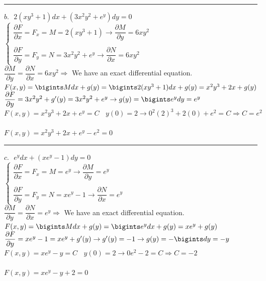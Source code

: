 \documentclass[fleqn]{article}
\begin{document}
\begin{enumerate}
      \textcolor{hwColor}{  
        \rule{15cm}{0.4pt}  
      }

      \textcolor{hwColor}{ 
        $b. ~~~ 2(xy^3+1)dx+(3x^2y^2+e^y)dy=0$ \\
        $
        \begin{cases}
          \dfrac{\partial F}{\partial x}=F_x=M=2(xy^3+1) \rightarrow \dfrac{\partial M}{\partial y}=6xy^2 \\
          \\
          \dfrac{\partial F}{\partial y}=F_y=N=3x^2y^2+e^y \rightarrow \dfrac{\partial N}{\partial x}=6xy^2
        \end{cases}
        $ \\
        $\dfrac{\partial M}{\partial y}=\dfrac{\partial N}{\partial x}=6xy^2 \Longrightarrow$ We have an exact differential equation. \\
        $F(x,y)=\bigints Mdx+g(y)=\bigints 2(xy^3+1) dx+g(y)=x^2y^3+2x+g(y)$ \\
        $\dfrac{\partial F}{\partial y}=3x^2y^2+g^{\prime}(y)=3x^2y^2+e^y \rightarrow g(y)=\bigints e^ydy=e^y$ \\
        $F(x,y)=x^2y^3+2x+e^y=C ~~~~ y(0)=2 \rightarrow 0^2(2)^3+2(0)+e^2=C \Longrightarrow C=e^2$ \\
        \\
        $F(x,y)=x^2y^3+2x+e^y-e^2=0$
      }

      \textcolor{hwColor}{  
        \rule{15cm}{0.4pt}  
      }

      \textcolor{hwColor}{ 
        $c. ~~~ e^ydx+(xe^y-1)dy=0 $ \\
        $
        \begin{cases}
          \dfrac{\partial F}{\partial x}=F_x=M=e^y \rightarrow \dfrac{\partial M}{\partial y}=e^y \\
          \\
          \dfrac{\partial F}{\partial y}=F_y=N=xe^y-1 \rightarrow \dfrac{\partial N}{\partial x}=e^y
        \end{cases}
        $ \\
        $\dfrac{\partial M}{\partial y}=\dfrac{\partial N}{\partial x}=e^y \Longrightarrow$ We have an exact differential equation. \\
        $F(x,y)=\bigints Mdx+g(y)=\bigints e^y dx+g(y)=xe^y+g(y)$ \\
        $\dfrac{\partial F}{\partial y}=xe^y-1=xe^y+g^{\prime}(y) \rightarrow g^{\prime}(y)=-1 \rightarrow g(y)=-\bigints dy=-y$ \\
        $F(x,y)=xe^y-y=C ~~~~ y(0)=2 \rightarrow 0e^2-2=C \Longrightarrow C=-2$ \\
        \\
        $F(x,y)=xe^y-y+2=0$
      }


\end{enumerate}
\end{document}
